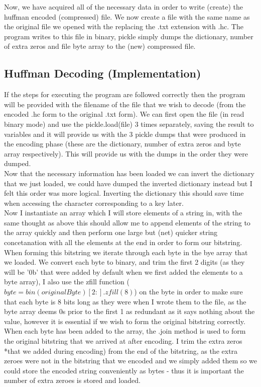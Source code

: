 \documentclass{mm2}
\begin{document}
Now, we have acquired all of the necessary data in order to write (create) the huffman encoded (compressed) file. We now create a file with the same name as the original file we opened with the replacing the .txt extension with .hc. The program writes to this file in binary, pickle simply dumps the dictionary, number of extra zeros and file byte array to the (new) compressed file.
\subsection{Huffman Decoding (Implementation)}
If the steps for executing the program are followed correctly then the program will be provided with the filename of the file that we wish to decode (from the encoded .hc form to the original .txt form). We can first open the file (in read binary mode) and use the pickle.load(file) 3 times separately, saving the result to variables and it will provide us with the 3 pickle dumps that were produced in the encoding phase (these are the dictionary, number of extra zeros and byte array respectively). This will provide us with the dumps in the order they were dumped.\\
Now that the necessary information has been loaded we can invert the dictionary that we just loaded, we could have dumped the inverted dictionary instead but I felt this order was more logical. Inverting the dictionary this should save time when accessing the character corresponding to a key later.\\
Now I instantiate an array which I will store elements of a string in, with the same thought as above this should allow me to append elements of the string to the array quickly and then perform one large but (net) quicker string concetanation with all the elements at the end in order to form our bitstring. When forming this bitstring we iterate through each byte in the bye array that we loaded. We convert each byte to binary, and trim the first 2 digits (as they will be '0b' that were added by default when we first added the elements to a byte array), I also use the zfill function ($byte = bin(originalByte)[2:].zfill(8)$) on the byte in order to  make sure that each byte is 8 bits long as they were when I wrote them to the file, as the byte array deems 0s prior to the first 1 as redundant as it says nothing about the value, however it is essential if we wish to form the original bitstring correctly. When each byte has been added to the array, the .join method is used to form the original bitstring that we arrived at after encoding. I trim the extra zeros *that we added during encoding) from the end of the bitstring, as the extra zeroes were not in the bitstring that we encoded and we simply added them so we could store the encoded string conveniently as bytes - thus it is important the number of extra zeroes is stored and loaded.\\
\end{document}
